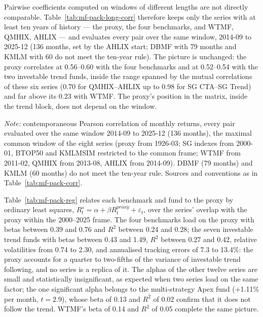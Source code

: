 \documentclass[11pt]{article}
\begin{document}
Pairwise coefficients computed on windows of different lengths are not
directly comparable. Table~\ref{tab:mf-pack-long-corr} therefore keeps only
the series with at least ten years of history --- the proxy, the four
benchmarks, and WTMF, QMHIX, AHLIX --- and evaluates every pair over the same
window, 2014-09 to 2025-12 (136 months, set by the AHLIX start; DBMF with 79
months and KMLM with 60 do not meet the ten-year rule). The picture is
unchanged: the proxy correlates at 0.56--0.60 with the four benchmarks and at
0.52--0.54 with the two investable trend funds, inside the range spanned by
the mutual correlations of these six series (0.70 for QMHIX--AHLIX up to 0.98
for SG CTA--SG Trend) and far above its 0.23 with WTMF. The proxy's
position in the matrix, inside the trend block, does not depend on the
window.

\begin{table}[H]
\centering
\caption{Correlation matrix over a common window: the proxy and the
benchmarks and funds with at least ten years of history}
\label{tab:mf-pack-long-corr}
\footnotesize

\begin{minipage}{0.86\textwidth}\footnotesize
\textit{Note:} contemporaneous Pearson correlation of monthly returns, every
pair evaluated over the same window 2014-09 to 2025-12 (136 months), the
maximal common window of the eight series (proxy from 1926-03; SG indexes
from 2000-01, BTOP50 and KMLMSIM restricted to the common frame; WTMF from
2011-02, QMHIX from 2013-08, AHLIX from 2014-09). DBMF (79 months) and KMLM
(60 months) do not meet the ten-year rule. Sources and conventions as
in Table~\ref{tab:mf-pack-corr}.
\end{minipage}
\end{table}

Table~\ref{tab:mf-pack-reg} relates each benchmark and fund to the proxy by
ordinary least squares, $R^{s}_t = \alpha + \beta R^{proxy}_t +
\varepsilon_t$, over the series' overlap with the proxy within the 2000--2025
frame. The four benchmarks load on the proxy with betas between 0.39 and
0.76 and $R^2$ between 0.24 and 0.28; the seven investable trend funds with
betas between 0.43 and 1.49, $R^2$ between 0.27 and 0.42, relative
volatilities from 0.74 to 2.30, and annualised tracking errors of 7.3 to
13.4\%: the proxy accounts for a quarter to two-fifths of the variance of
investable trend following, and no series is a replica of it. The alphas of
the other twelve series are small and statistically insignificant,
as expected when two series load on the same factor; the one significant
alpha belongs to the multi-strategy Apex fund (+1.11\% per month,
$t = 2.9$), whose beta of 0.13 and $R^2$ of 0.02 confirm that it does not
follow the trend. WTMF's beta of 0.14 and $R^2$ of 0.05 complete the same
picture.
\end{document}
